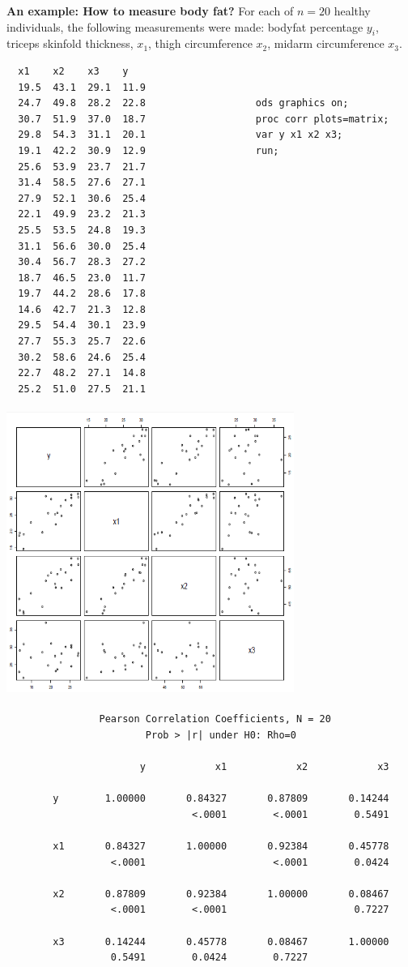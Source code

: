 \documentclass{article}
\begin{document}
\textbf{An example: How to measure body fat?} For each of $n=20$ healthy individuals, the following measurements were made: bodyfat percentage $y_i$, triceps skinfold thickness, $x_{1}$, thigh circumference $x_{2}$, midarm circumference $x_{3}$.
\begin{small}
\begin{verbatim}
  x1    x2    x3    y
  19.5  43.1  29.1  11.9
  24.7  49.8  28.2  22.8                   ods graphics on;
  30.7  51.9  37.0  18.7                   proc corr plots=matrix;
  29.8  54.3  31.1  20.1                   var y x1 x2 x3;
  19.1  42.2  30.9  12.9                   run;
  25.6  53.9  23.7  21.7
  31.4  58.5  27.6  27.1
  27.9  52.1  30.6  25.4
  22.1  49.9  23.2  21.3
  25.5  53.5  24.8  19.3
  31.1  56.6  30.0  25.4
  30.4  56.7  28.3  27.2
  18.7  46.5  23.0  11.7
  19.7  44.2  28.6  17.8
  14.6  42.7  21.3  12.8
  29.5  54.4  30.1  23.9
  27.7  55.3  25.7  22.6
  30.2  58.6  24.6  25.4
  22.7  48.2  27.1  14.8
  25.2  51.0  27.5  21.1
\end{verbatim}
\end{small}

\begin{center}
\includegraphics[height=3.7in,width=3.7in]{bodyfat}
\end{center}
\begin{small}
\begin{verbatim}
                Pearson Correlation Coefficients, N = 20 
                        Prob > |r| under H0: Rho=0
 
                       y            x1            x2            x3

        y        1.00000       0.84327       0.87809       0.14244
                                <.0001        <.0001        0.5491

        x1       0.84327       1.00000       0.92384       0.45778
                  <.0001                      <.0001        0.0424

        x2       0.87809       0.92384       1.00000       0.08467
                  <.0001        <.0001                      0.7227

        x3       0.14244       0.45778       0.08467       1.00000
                  0.5491        0.0424        0.7227              
\end{verbatim}
\end{small}
\end{document}
